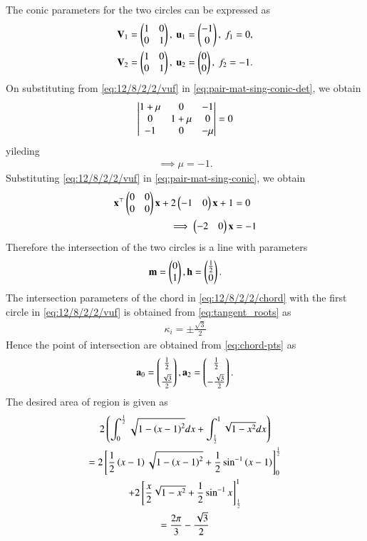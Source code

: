 The conic parameters for the two circles can be expressed as
\begin{align}
\begin{split}
	\mathbf{V}_1 &= \begin{pmatrix}1&0\\0&1\end{pmatrix},\
	\mathbf{u}_1 = \begin{pmatrix}-1\\0\end{pmatrix},\
	f_1 = 0,
	\\
	\mathbf{V}_2 &= \begin{pmatrix}1&0\\0&1\end{pmatrix},\
	\mathbf{u}_2 = \begin{pmatrix}0\\0\end{pmatrix},\
	f_2 = -1.
\end{split}
	\label{eq:12/8/2/2/vuf}
\end{align}
On substituting from
	\eqref{eq:12/8/2/2/vuf}
	in
	  \eqref{eq:pair-mat-sing-conic-det}, we obtain
\begin{align}
	\begin{vmatrix}1+\mu & 0 & -1 \\ 0 & 1+\mu & 0 \\ -1 & 0 & -\mu\end{vmatrix} = 0
\end{align}
yileding
\begin{align}
	\implies \mu = -1.
\end{align}
Substituting 
	\eqref{eq:12/8/2/2/vuf}
in 
	  \eqref{eq:pair-mat-sing-conic},
	  we obtain
\begin{align}
	\mathbf{x}^\top\begin{pmatrix}0&0\\0&0\end{pmatrix}\mathbf{x} + 2\begin{pmatrix}-1&0\end{pmatrix}\mathbf{x} + 1 &= 0\\
\implies	\begin{pmatrix}-2&0\end{pmatrix}\mathbf{x} &= -1 
\label{eq:12/8/2/2/chord}
\end{align}
Therefore the intersection of the two circles is a line with parameters
\begin{align}
	\mathbf{m} = \begin{pmatrix}0\\1\end{pmatrix},  \mathbf{h} = \begin{pmatrix}\frac{1}{2}\\0\end{pmatrix}.
\end{align}
	The intersection parameters of the 
	chord in 
\eqref{eq:12/8/2/2/chord}
with the 
first circle in \eqref{eq:12/8/2/2/vuf} is obtained from 
\eqref{eq:tangent_roots}
	as
\begin{align}
	\kappa_i= \pm\frac{\sqrt{3}}{2}
\end{align}
Hence the point of intersection are
obtained from
	\eqref{eq:chord-pts}
	as
\begin{align}
	\mathbf{a}_0 = \begin{pmatrix}\frac{1}{2}\\[1ex]\frac{\sqrt{3}}{2}\end{pmatrix}, \mathbf{a}_2 = \begin{pmatrix}\frac{1}{2}\\[1ex]-\frac{\sqrt{3}}{2}\end{pmatrix}.
\end{align}
The desired area of region is given as
\begin{multline}
	2\left(\int_{0}^{\frac{1}{2}} \sqrt{1-\left(x-1\right)^2}dx + \int_{\frac{1}{2}}^{1} \sqrt{1-x^2}dx\right)\\
		=2{}\left[\frac{1}{2}\left(x-1\right)\sqrt{1-\left(x-1\right)^2}+\frac{1}{2}\sin^{-1}\left(x-1\right)\right]_{0}^{\frac{1}{2}}\\
		 +2{}\left[\frac{x}{2}\sqrt{1-x^2}+\frac{1}{2}\sin^{-1}x\right]_{\frac{1}{2}}^{1}
		 \\
	= \frac{2\pi}{3}-\frac{\sqrt{3}}{2}
\end{multline}
